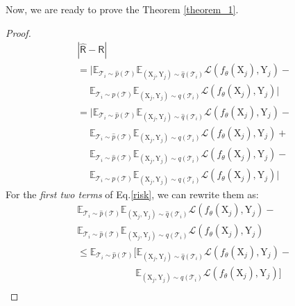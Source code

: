 Now, we are ready to prove the Theorem \ref{theorem_1}.
\begin{proof}
\begin{equation}
\label{risk}
\begin{aligned}
    &|\hat{\mathsf{R}}-\mathsf{R}|\\
    &=\Big|\mathbb E_{\mathcal{T}_i\sim \hat{p}(\mathcal{T})}\mathbb E_{(\mathrm{X}_j,\mathrm{Y}_j)\sim \hat{q}(\mathcal{T}_i)}\mathcal{L}(f_\theta(\mathrm{X}_j),\mathrm{Y}_j)- \\
    & \quad \; \mathbb E_{\mathcal{T}_i\sim p(\mathcal{T})}\mathbb E_{(\mathrm{X}_j,\mathrm{Y}_j)\sim q(\mathcal{T}_i)}\mathcal{L}(f_\theta(\mathrm{X}_j),\mathrm{Y}_j)\Big|\\
    &=\Big|\mathbb E_{\mathcal{T}_i\sim \hat{p}(\mathcal{T})}\mathbb E_{(\mathrm{X}_j,\mathrm{Y}_j)\sim \hat{q}(\mathcal{T}_i)}\mathcal{L}(f_\theta(\mathrm{X}_j),\mathrm{Y}_j) - \\
    & \quad \; \mathbb E_{\mathcal{T}_i\sim \hat{p}(\mathcal{T})}\mathbb E_{(\mathrm{X}_j,\mathrm{Y}_j)\sim q(\mathcal{T}_i)}\mathcal{L}(f_\theta(\mathrm{X}_j),\mathrm{Y}_j) + \\
    & \quad \; \mathbb E_{\mathcal{T}_i\sim \hat{p}(\mathcal{T})}\mathbb E_{(\mathrm{X}_j,\mathrm{Y}_j)\sim q(\mathcal{T}_i)}\mathcal{L}(f_\theta(\mathrm{X}_j),\mathrm{Y}_j) - \\
    & \quad \; \mathbb E_{\mathcal{T}_i\sim p(\mathcal{T})}\mathbb E_{(\mathrm{X}_j,\mathrm{Y}_j)\sim q(\mathcal{T}_i)}\mathcal{L}(f_\theta(\mathrm{X}_j),\mathrm{Y}_j) \Big|
    \end{aligned}
\end{equation}
For the \textit{first two terms} of Eq.\ref{risk}, we can rewrite them as:
\begin{equation}
\label{first_term}
\begin{aligned}
    &\mathbb E_{\mathcal{T}_i\sim \hat{p}(\mathcal{T})} \mathbb E_{(\mathrm{X}_j,\mathrm{Y}_j)\sim \hat{q}(\mathcal{T}_i)}\mathcal{L}(f_\theta(\mathrm{X}_j),\mathrm{Y}_j) - \\
    &\mathbb E_{\mathcal{T}_i\sim \hat{p}(\mathcal{T})}\mathbb E_{(\mathrm{X}_j,\mathrm{Y}_j)\sim q(\mathcal{T}_i)}\mathcal{L}(f_\theta(\mathrm{X}_j),\mathrm{Y}_j) \\
    &\leq \mathbb E_{\mathcal{T}_i\sim \hat{p}(\mathcal{T})}\Big[\mathbb E_{(\mathrm{X}_j,\mathrm{Y}_j)\sim \hat{q}(\mathcal{T}_i)}\mathcal{L}(f_\theta(\mathrm{X}_j),\mathrm{Y}_j) - \\
    & \qquad \qquad \qquad \mathbb E_{(\mathrm{X}_j,\mathrm{Y}_j)\sim q(\mathcal{T}_i)}\mathcal{L}(f_\theta(\mathrm{X}_j),\mathrm{Y}_j)\Big] \\

\end{aligned}
\end{equation}
\end{proof}
